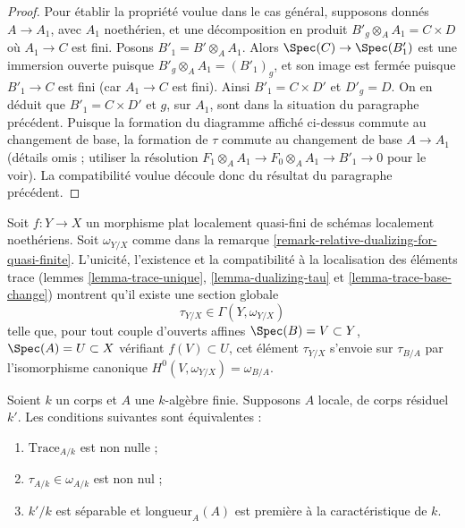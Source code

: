 \begin{proof}
\medskip\noindent
Pour établir la propriété voulue dans le cas général, supposons donnés
$A \to A_1$, avec $A_1$ noethérien, et une décomposition en produit
$B'_g \otimes_A A_1 = C \times D$ où $A_1 \to C$ est fini.
Posons $B'_1 = B' \otimes_A A_1$. Alors $\Spec(C) \to \Spec(B'_1)$
est une immersion ouverte puisque $B'_g \otimes_A A_1 = (B'_1)_g$, et
son image est fermée puisque $B'_1 \to C$ est fini (car $A_1 \to C$
est fini). Ainsi $B'_1 = C \times D'$ et $D'_g = D$.
On en déduit que $B'_1 = C \times D'$ et $g$, sur $A_1$,
sont dans la situation du paragraphe précédent.
Puisque la formation du diagramme affiché ci-dessus
commute au changement de base, la formation de $\tau$ commute
au changement de base $A \to A_1$ (détails omis ; utiliser la
résolution $F_1 \otimes_A A_1 \to F_0 \otimes_A A_1 \to B'_1 \to 0$
pour le voir). La compatibilité voulue découle donc du résultat
du paragraphe précédent.
\end{proof}

\begin{remark}
\label{remark-relative-dualizing-for-flat-quasi-finite}
Soit $f : Y \to X$ un morphisme plat localement quasi-fini de schémas localement
noethériens. Soit $\omega_{Y/X}$ comme dans la
remarque \ref{remark-relative-dualizing-for-quasi-finite}.
L'unicité, l'existence et la compatibilité à la
localisation des éléments trace
(lemmes \ref{lemma-trace-unique}, \ref{lemma-dualizing-tau} et
\ref{lemma-trace-base-change})
montrent qu'il existe une section globale
$$
\tau_{Y/X} \in \Gamma(Y, \omega_{Y/X})
$$
telle que, pour tout couple d'ouverts affines
$\Spec(B) = V \subset Y$, $\Spec(A) = U \subset X$ vérifiant $f(V) \subset U$,
cet élément $\tau_{Y/X}$ s'envoie sur $\tau_{B/A}$ par
l'isomorphisme canonique
$H^0(V, \omega_{Y/X}) = \omega_{B/A}$.
\end{remark}

\begin{lemma}
\label{lemma-tau-nonzero}
Soient $k$ un corps et $A$ une $k$-algèbre finie. Supposons $A$
locale, de corps résiduel $k'$. Les conditions suivantes sont équivalentes :
\begin{enumerate}
\item $\text{Trace}_{A/k}$ est non nulle ;
\item $\tau_{A/k} \in \omega_{A/k}$ est non nul ;
\item $k'/k$ est séparable et $\text{longueur}_A(A)$ est première
à la caractéristique de $k$.
\end{enumerate}
\end{lemma}

